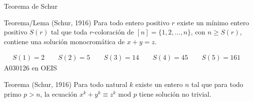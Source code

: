 \begin{frame}{Teorema de Schur}
    \begin{block}{Teorema/Lema (Schur, 1916)}
        Para todo entero positivo $r$ existe un mínimo entero positivo $S(r)$ tal que toda $r$-coloración de $[n]=\{1,2,\dots,n\}$, con $n\geq S(r)$, contiene una solución monocromática de $x+y=z$.
    \end{block}\pause
    \begin{center}
        \begin{align*}
        S(1)=2 \qquad
        S(2)=5 \qquad
        S(3) = 14 \qquad
        S(4) = 45 \qquad
        S(5) = 161
        \end{align*}    
        {\footnotesize A030126 en OEIS}
    \end{center}

    
    \pause

    \begin{block}{Teorema (Schur, 1916)}
        Para todo natural $k$ existe un entero $n$ tal que para todo primo $p>n$, la ecuación $x^{k}+y^{k}\equiv z^{k}\text{ mod }p$ tiene solución no trivial.
    \end{block}
\end{frame}
